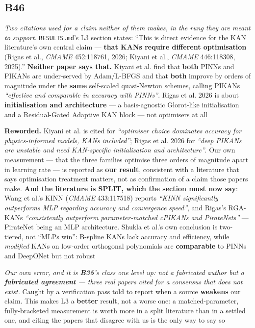 \documentclass[10pt]{article}
\begin{document}
\subsection*{B46}\label{led:B46}
\begin{description}[leftmargin=0pt,itemsep=1pt]
\item[Defect.] \emph{Two citations used for a claim neither of them makes, in the rung they are meant to support.} \texttt{RESULTS.md}'s L3 section states: ``This is direct evidence for the KAN literature's own central claim --- \textbf{that KANs require different optimisation} (Rigas et al., \emph{CMAME} 452:118761, 2026; Kiyani et al., \emph{CMAME} 446:118308, 2025).'' \textbf{Neither paper says that.} Kiyani et al. find that \textbf{both} PINNs and PIKANs are under-served by Adam/L-BFGS and that \textbf{both} improve by orders of magnitude under the \textbf{same} self-scaled quasi-Newton schemes, calling PIKANs \emph{``effective and comparable in accuracy with PINNs''}. Rigas et al. 2026 is about \textbf{initialisation and architecture} --- a basis-agnostic Glorot-like initialisation and a Residual-Gated Adaptive KAN block --- not optimisers at all
\item[Resolution.] \textbf{Reworded.} Kiyani et al. is cited for \emph{``optimiser choice dominates accuracy for physics-informed models, KANs included''}; Rigas et al. 2026 for \emph{``deep PIKANs are unstable and need KAN-specific initialisation and architecture''}. Our own measurement --- that the three families optimise three orders of magnitude apart in learning rate --- is reported as \textbf{our result}, consistent with a literature that says optimisation treatment matters, not as confirmation of a claim those papers make. \textbf{And the literature is SPLIT, which the section must now say}: Wang et al.'s KINN (\emph{CMAME} 433:117518) reports \emph{``KINN significantly outperforms MLP regarding accuracy and convergence speed''}, and Rigas's RGA-KANs \emph{``consistently outperform parameter-matched cPIKANs and PirateNets''} --- PirateNet being an MLP architecture. Shukla et al.'s own conclusion is two-tiered, not ``MLPs win'': B-spline KANs lack accuracy and efficiency, while \emph{modified} KANs on low-order orthogonal polynomials are \textbf{comparable} to PINNs and DeepONet but not robust
\item[Note.] \emph{Our own error, and it is \textbf{B35}'s class one level up: not a fabricated author but a \textbf{fabricated agreement} --- three real papers cited for a consensus that does not exist.} Caught by a verification pass told to report when a source \textbf{weakens} our claim. This makes L3 a \textbf{better} result, not a worse one: a matched-parameter, fully-bracketed measurement is worth more in a split literature than in a settled one, and citing the papers that disagree with us is the only way to say so
\end{description}
\end{document}
